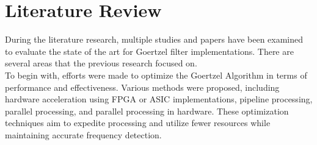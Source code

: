 
\section{Literature Review}\label{sec:lit_ref}

During the literature research, multiple studies and papers have been examined to evaluate the state of the art for Goertzel filter implementations. There are several areas that the previous research focused on. \\
To begin with, efforts were made to optimize the Goertzel Algorithm in terms of performance and effectiveness. Various methods were proposed, including hardware acceleration using FPGA or ASIC implementations, pipeline processing, parallel processing, and parallel processing in hardware. These optimization techniques aim to expedite processing and utilize fewer resources while maintaining accurate frequency detection.

